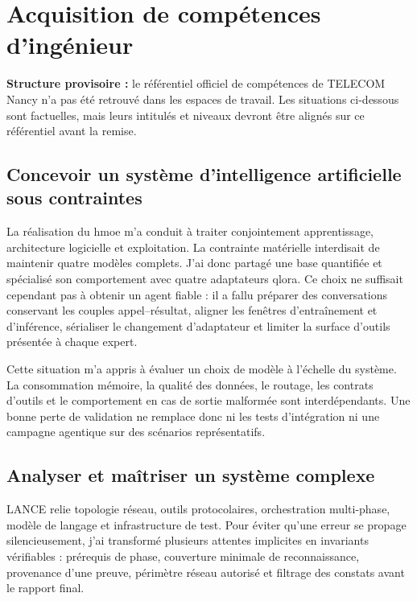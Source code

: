 \chapter{Acquisition de compétences d'ingénieur}
\label{chap:competences}

\textbf{Structure provisoire :} le référentiel officiel de compétences de
TELECOM Nancy n'a pas été retrouvé dans les espaces de travail. Les situations
ci-dessous sont factuelles, mais leurs intitulés et niveaux devront être alignés
sur ce référentiel avant la remise.

\section{Concevoir un système d'intelligence artificielle sous contraintes}

La réalisation du \gls{hmoe} m'a conduit à traiter conjointement apprentissage,
architecture logicielle et exploitation. La contrainte matérielle interdisait
de maintenir quatre modèles complets. J'ai donc partagé une base quantifiée et
spécialisé son comportement avec quatre adaptateurs \gls{qlora}. Ce choix ne
suffisait cependant pas à obtenir un agent fiable : il a fallu préparer des
conversations conservant les couples appel--résultat, aligner les fenêtres
d'entraînement et d'inférence, sérialiser le changement d'adaptateur et limiter
la surface d'outils présentée à chaque expert.

Cette situation m'a appris à évaluer un choix de modèle à l'échelle du système.
La consommation mémoire, la qualité des données, le routage, les contrats
d'outils et le comportement en cas de sortie malformée sont interdépendants.
Une bonne perte de validation ne remplace donc ni les tests d'intégration ni une
campagne agentique sur des scénarios représentatifs.

\section{Analyser et maîtriser un système complexe}

LANCE relie topologie réseau, outils protocolaires, orchestration multi-phase,
modèle de langage et infrastructure de test. Pour éviter qu'une erreur se
propage silencieusement, j'ai transformé plusieurs attentes implicites en
invariants vérifiables : prérequis de phase, couverture minimale de
reconnaissance, provenance d'une preuve, périmètre réseau autorisé et filtrage
des constats avant le rapport final.

